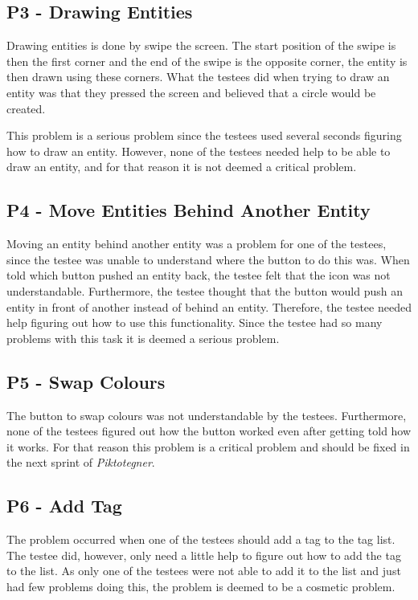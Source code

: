 \subsection*{P3 - Drawing Entities}
Drawing entities is done by swipe the screen.
The start position of the swipe is then the first corner and the end of the swipe is the opposite corner, the entity is then drawn using these corners.
What the testees did when trying to draw an entity was that they pressed the screen and believed that a circle would be created.

This problem is a serious problem since the testees used several seconds figuring how to draw an entity.
However, none of the testees needed help to be able to draw an entity, and for that reason it is not deemed a critical problem.

\subsection*{P4 - Move Entities Behind Another Entity}
Moving an entity behind another entity was a problem for one of the testees, since the testee was unable to understand where the button to do this was.
When told which button pushed an entity back, the testee felt that the icon was not understandable.
Furthermore, the testee thought that the button would push an entity in front of another instead of behind an entity.
Therefore, the testee needed help figuring out how to use this functionality.
Since the testee had so many problems with this task it is deemed a serious problem.

\subsection*{P5 - Swap Colours}
The button to swap colours was not understandable by the testees.
Furthermore, none of the testees figured out how the button worked even after getting told how it works.
For that reason this problem is a critical problem and should be fixed in the next sprint of \textit{Piktotegner}.

\subsection*{P6 - Add Tag}
The problem occurred when one of the testees should add a tag to the tag list.
The testee did, however, only need a little help to figure out how to add the tag to the list.
As only one of the testees were not able to add it to the list and just had few problems doing this, the problem is deemed to be a cosmetic problem.

